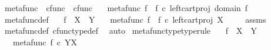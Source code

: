 \begin{isabellebody}
{\isafoldproof}%
%
\isadelimproof
%
\endisadelimproof
%
\isadelimdocument
%
\endisadelimdocument
%
\isatagdocument
%
\isamarkuptrue%
%
\isamarkuptrue%
%
\endisatagdocument
{\isafolddocument}%
%
\isadelimdocument
%
\endisadelimdocument
{}\isamarkupfalse%
\ metafunc\ {\isacharcolon}{\kern0pt}{\isacharcolon}{\kern0pt}\ {\isachardoublequoteopen}cfunc\ {\isasymRightarrow}\ cfunc{\isachardoublequoteclose}\ \isanewline
\ \ {\isachardoublequoteopen}metafunc\ f\ {\isasymequiv}\ {\isacharparenleft}{\kern0pt}f\ {\isasymcirc}\isactrlsub c\ {\isacharparenleft}{\kern0pt}left{\isacharunderscore}{\kern0pt}cart{\isacharunderscore}{\kern0pt}proj\ {\isacharparenleft}{\kern0pt}domain\ f{\isacharparenright}{\kern0pt}\ {\isasymone}{\isacharparenright}{\kern0pt}{\isacharparenright}{\kern0pt}\isactrlsup {\isasymsharp}{\isachardoublequoteclose}\isanewline
\isanewline
{}\isamarkupfalse%
\ metafunc{\isacharunderscore}{\kern0pt}def{}{\isacharcolon}{\kern0pt}\isanewline
\ \ \ {\isachardoublequoteopen}f\ {\isacharcolon}{\kern0pt}\ X\ {\isasymrightarrow}\ Y{\isachardoublequoteclose}\isanewline
\ \ \ {\isachardoublequoteopen}metafunc\ f\ {\isacharequal}{\kern0pt}\ {\isacharparenleft}{\kern0pt}f\ {\isasymcirc}\isactrlsub c\ {\isacharparenleft}{\kern0pt}left{\isacharunderscore}{\kern0pt}cart{\isacharunderscore}{\kern0pt}proj\ X\ {\isasymone}{\isacharparenright}{\kern0pt}{\isacharparenright}{\kern0pt}\isactrlsup {\isasymsharp}{\isachardoublequoteclose}\isanewline
%
\isadelimproof
\ \ %
\endisadelimproof
%
\isatagproof
{}\isamarkupfalse%
\ assms\ \isamarkupfalse%
\ metafunc{\isacharunderscore}{\kern0pt}def\ cfunc{\isacharunderscore}{\kern0pt}type{\isacharunderscore}{\kern0pt}def\ \isamarkupfalse%
\ auto%
\endisatagproof
{\isafoldproof}%
%
\isadelimproof
\isanewline
%
\endisadelimproof
\isanewline
{}\isamarkupfalse%
\ metafunc{\isacharunderscore}{\kern0pt}type{\isacharbrackleft}{\kern0pt}type{\isacharunderscore}{\kern0pt}rule{\isacharbrackright}{\kern0pt}{\isacharcolon}{\kern0pt}\isanewline
\ \ \ {\isachardoublequoteopen}f\ {\isacharcolon}{\kern0pt}\ X\ {\isasymrightarrow}\ Y{\isachardoublequoteclose}\isanewline
\ \ \ {\isachardoublequoteopen}metafunc\ f\ {\isasymin}\isactrlsub c\ Y\isactrlbsup X\isactrlesup {\isachardoublequoteclose}\isanewline
%
\isadelimproof
\ \ %
\endisadelimproof

\end{isabellebody}
